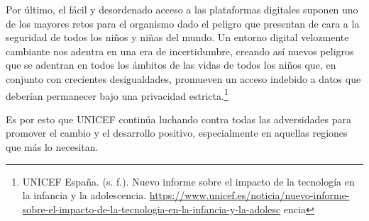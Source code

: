 Por último, el fácil y desordenado acceso a las plataformas digitales suponen uno de los mayores retos para el organismo dado el peligro que presentan de cara a la seguridad de todos los niños y niñas del mundo. Un entorno digital velozmente cambiante nos adentra en una era de incertidumbre, creando así nuevos peligros que se adentran en todos los ámbitos de las vidas de todos los niños que, en conjunto con crecientes desigualdades, promueven un acceso indebido a datos que deberían permanecer bajo una privacidad estricta.\footnote{UNICEF España. (s. f.). Nuevo informe sobre el impacto de la tecnología en la infancia y la adolescencia. \url{https://www.unicef.es/noticia/nuevo-informe-sobre-el-impacto-de-la-tecnologia-en-la-infancia-y-la-adolesc} encia}

Es por esto que UNICEF continúa luchando contra todas las adversidades para promover el cambio y el desarrollo positivo, especialmente en aquellas regiones que más lo necesitan.
